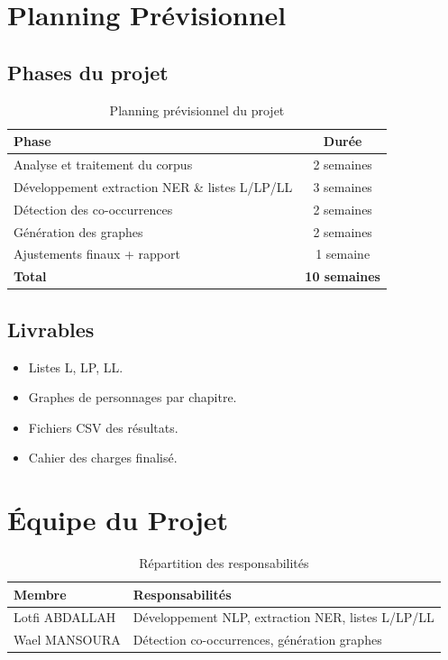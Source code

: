 \documentclass[12pt,a4paper]{article}
\begin{document}
\section{Planning Prévisionnel}

\subsection{Phases du projet}

\begin{table}[h!]
\centering
\begin{tabular}{@{}lc@{}}
\toprule
\textbf{Phase} & \textbf{Durée} \\
\midrule
Analyse et traitement du corpus & 2 semaines \\
Développement extraction NER \& listes L/LP/LL & 3 semaines \\
Détection des co-occurrences & 2 semaines \\
Génération des graphes & 2 semaines \\
Ajustements finaux + rapport & 1 semaine \\
\midrule
\textbf{Total} & \textbf{10 semaines} \\
\bottomrule
\end{tabular}
\caption{Planning prévisionnel du projet}
\end{table}

\subsection{Livrables}

\begin{itemize}
    \item Listes L, LP, LL.
    \item Graphes de personnages par chapitre.
    \item Fichiers CSV des résultats.
    \item Cahier des charges finalisé.
\end{itemize}

\section{Équipe du Projet}

\begin{table}[h!]
\centering
\begin{tabular}{@{}ll@{}}
\toprule
\textbf{Membre} & \textbf{Responsabilités} \\
\midrule
Lotfi ABDALLAH & Développement NLP, extraction NER, listes L/LP/LL \\
Wael MANSOURA & Détection co-occurrences, génération graphes \\
\bottomrule
\end{tabular}
\caption{Répartition des responsabilités}
\end{table}
\end{document}
